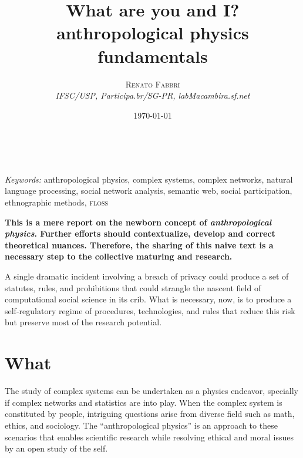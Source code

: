 \documentclass[a4paper, 11pt]{article} %
\title{\textbf{What are you and I?}\\ %
anthropological physics fundamentals} %
\author{\textsc{Renato Fabbri} %
\\{\textit{IFSC/USP, Participa.br/SG-PR, labMacambira.sf.net}}} %
\date{\today} %
\makeatletter
\newcommand{\floss}{\textsc{floss}}
\renewcommand{\maketitle}{ %
\begin{flushright} %
{\LARGE\@title} %

\vspace{50pt} %

{\large\@author} %
\\\@date %

\vspace{40pt} %
\end{flushright}
}
\makeatother
\begin{document}
\maketitle %



%
%
%

\hspace*{3,6mm}\textit{Keywords:} anthropological physics, complex systems, complex networks, natural language processing, social network analysis, semantic web, social participation, ethnographic methods, \floss


\vspace*{1cm}
{\bf This is a mere report on the newborn concept of \emph{anthropological physics}. Further efforts should contextualize, develop and correct theoretical nuances. Therefore, the sharing of this naive text is a necessary step to the collective maturing and research.}
\vspace*{.6cm}

\newpage
\epigraph{A single dramatic incident involving a breach of privacy could produce a set of statutes, rules, and prohibitions that could strangle the nascent field of computational social science in its crib. What is necessary, now, is to produce a self-regulatory regime of procedures, technologies, and rules that reduce this risk but preserve most of the research potential.}{\cite{life}}

\section*{What}
The study of complex systems can be undertaken as a physics endeavor, specially if complex networks and statistics are into play.
When the complex system is constituted by people, intriguing questions arise from diverse field such as math, ethics, and sociology. The ``anthropological physics'' is an approach to these scenarios that enables scientific research while resolving ethical and moral issues by an open study of the self.
\end{document}
